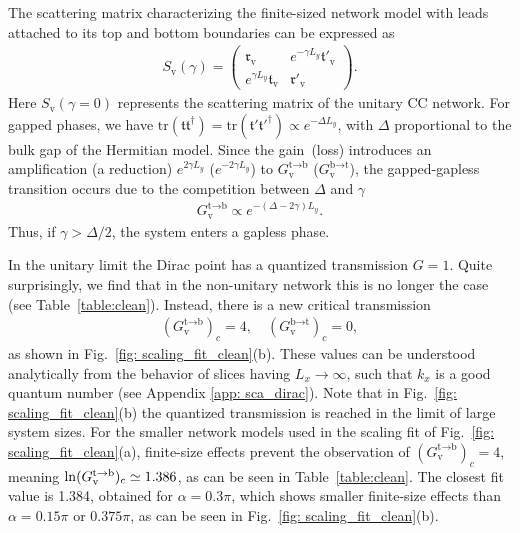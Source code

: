 \documentclass[aps,pra,reprint,superscriptaddress,showkeys,amsmath,amssymb,longbibliography]{revtex4-1}
\begin{document}
The scattering matrix characterizing the finite-sized network model with leads attached to its top and bottom boundaries can be expressed as
\begin{eqnarray}
S_{\text{v}}(\gamma)=\begin{pmatrix}
\mathfrak{r}_{\text{v}}&e^{-\gamma L_y}\mathfrak{t}'_{\text{v}}\\e^{\gamma L_y}\mathfrak{t}_{\text{v}} & \mathfrak{r}'_{\text{v}}
\end{pmatrix}.\label{eq:final_s}
\end{eqnarray}
Here $S_{\text{v}}(\gamma=0)$ represents the scattering matrix of the unitary CC network. 
For gapped phases, we  have $\text{tr}(\mathfrak{t}\mathfrak{t}^\dagger)=\text{tr}(\mathfrak{t}'\mathfrak{t}'^\dagger)\propto e^{-\Delta L_y}$, with $\Delta$ proportional to the bulk gap of the Hermitian model.
Since the gain~(loss) introduces an amplification (a reduction)
$e^{2\gamma L_y}$ ($e^{-2\gamma L_y}$) to $G_{\text{v}}^{\text{t}\rightarrow\text{b}}$ ($G_{\text{v}}^{\text{b}\rightarrow\text{t}}$), the gapped-gapless transition occurs due to the competition between $\Delta$ and $\gamma$
\begin{eqnarray}
G_{\text{v}}^{\text{t}\rightarrow\text{b}}\propto e^{-(\Delta -2\gamma)L_y}.
\end{eqnarray}
Thus, if $\gamma>\Delta/2$, the system enters a gapless phase.

In the unitary limit the Dirac point has a quantized transmission $G=1$.
Quite surprisingly, we find that in the non-unitary network this is no longer the case (see Table~\ref{table:clean}).
Instead, there is a new critical transmission
\begin{eqnarray}
  (G_{\text{v}}^{\text{t}\rightarrow\text{b}})_c=4,
  \quad
  (G_{\text{v}}^{\text{b}\rightarrow\text{t}})_c=0,\label{eq:critical_transmission}
\end{eqnarray}
as shown in Fig.~\ref{fig: scaling_fit_clean}(b).
These values can be understood analytically from the behavior of slices having $L_x\to\infty$, such that $k_x$ is a good quantum number (see Appendix \ref{app: sca_dirac}). 
Note that in Fig.~\ref{fig: scaling_fit_clean}(b) the quantized transmission is reached in the limit of large system sizes.
For the smaller network models used in the scaling fit of Fig.~\ref{fig: scaling_fit_clean}(a), finite-size effects prevent the observation of $(G_{\text{v}}^{\text{t}\rightarrow\text{b}})_c=4$, meaning ${\rm ln} (G_{\text{v}}^{\text{t}\rightarrow\text{b}})_c\simeq 1.386$, as can be seen in Table~\ref{table:clean}.
The closest fit value is 1.384, obtained for $\alpha=0.3\pi$, which shows smaller finite-size effects than $\alpha=0.15\pi$ or $0.375\pi$, as can be seen in Fig.~\ref{fig: scaling_fit_clean}(b).
\end{document}
